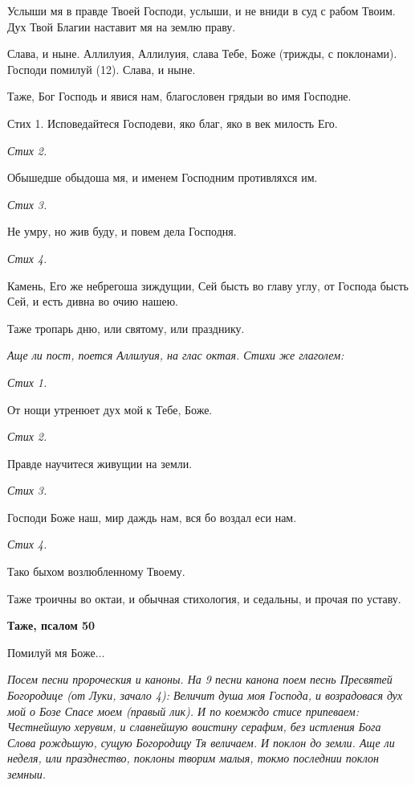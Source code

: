 Услыши мя в правде Твоей Господи, услыши, и не вниди в суд с рабом Твоим. Дух Твой Благии наставит мя на землю праву.


Слава, и ныне. Аллилуия, Аллилуия, слава Тебе, Боже (трижды, с поклонами). Господи помилуй (12). Слава, и ныне.


Таже, Бог Господь и явися нам, благословен грядыи во имя Господне.


Стих 1. Исповедайтеся Господеви, яко благ, яко в век милость Его.


\itshape Стих 2.\normalfont{}


Обышедше обыдоша мя, и именем Господним противляхся им.


\itshape Стих 3.\normalfont{}


Не умру, но жив буду, и повем дела Господня.


\itshape Стих 4.\normalfont{}


Камень, Его же небрегоша зиждущии, Сей бысть во главу углу, от Господа бысть Сей, и есть дивна во очию нашею.


Таже тропарь дню, или святому, или празднику.


\itshape Аще ли пост, поется Аллилуия, на глас октая. Стихи же глаголем:\normalfont{}


\itshape Стих 1.\normalfont{}


От нощи утренюет дух мой к Тебе, Боже.


\itshape Стих 2.\normalfont{}


Правде научитеся живущии на земли.


\itshape Стих 3.\normalfont{}


Господи Боже наш, мир даждь нам, вся бо воздал еси нам.


\itshape Стих 4.\normalfont{}


Тако быхом возлюбленному Твоему.


Таже троичны во октаи, и обычная стихология, и седальны, и прочая по уставу.





\bfseries Таже, псалом 50\normalfont{}


Помилуй мя Боже...


\itshape Посем песни пророческия и каноны. На 9 песни канона поем песнь Пресвятей Богородице (от Луки, зачало 4):\normalfont{} Величит душа моя Господа, и возрадовася дух мой о Бозе Спасе моем (правый лик). И по коемждо стисе припеваем: Честнейшую херувим, и славнейшую воистину серафим, без истления Бога Слова рождьшую, сущую Богородицу Тя величаем. И поклон до земли. Аще ли неделя, или празднество, поклоны творим малыя, токмо последнии поклон земныи.



